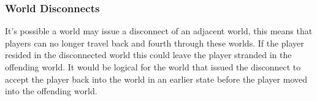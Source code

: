 \documentclass[runningheads,a4paper]{llncs}
\begin{document}
\subsubsection{World Disconnects}
It's possible a world may issue a disconnect of an adjacent world, this means that players can no longer travel back and fourth through these worlds. If the player resided in the disconnected world this could leave the player stranded in the offending world. It would be logical for the world that issued the disconnect to accept the player back into the world in an earlier state before the player moved into the offending world. 


\end{document}
